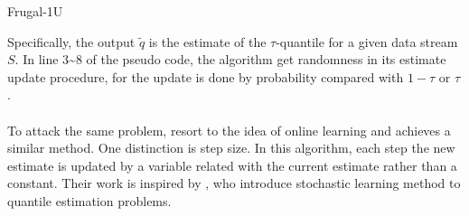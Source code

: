 \begin{algorithm}
    \caption{Frugal-1U}\label{alg:frugal_1U}
        \begin{algorithmic}[1]
                    \EndIf
                \EndFor
        \end{algorithmic}
    \end{algorithm}
Specifically, the output $\tilde{q}$ is the estimate of the $\tau$-quantile for a given data stream $S$.
In line 3\textasciitilde 8 of the pseudo code, the algorithm get randomness in its estimate update procedure, for the update is done by probability compared with $1- \tau$ or $\tau$.
\\\\
To attack the same problem, \citeauthor{yazidiQuantileEstimationDynamic2016}\cite{yazidiQuantileEstimationDynamic2016} resort to the idea of online learning and achieves a similar method. 
One distinction is step size. In this algorithm, each step the new estimate is updated by a variable related with the current estimate rather than a constant.
Their work is inspired by \citeauthor{tierneySpaceEfficientRecursiveProcedure1983}\cite{tierneySpaceEfficientRecursiveProcedure1983}, who introduce stochastic learning method to quantile estimation problems. 


